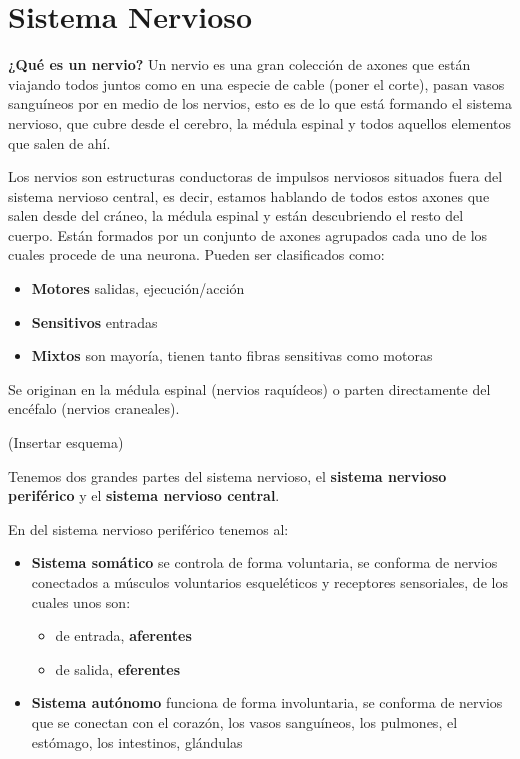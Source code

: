 \section{Sistema Nervioso}


\textbf{¿Qué es un nervio?}
Un nervio es una gran colección de axones que están viajando todos juntos como en una especie de cable (poner el corte), pasan vasos sanguíneos por en medio de los nervios, esto es de lo que está formando el sistema nervioso, que cubre desde el cerebro, la médula espinal y todos aquellos elementos que salen de ahí.

Los nervios son estructuras conductoras de impulsos nerviosos situados fuera del sistema nervioso central, es decir, estamos hablando de todos estos axones que salen desde del cráneo, la médula espinal y están descubriendo el resto del cuerpo.
Están formados por un conjunto de axones agrupados cada uno de los cuales procede de una neurona. Pueden ser clasificados como:

\begin{itemize}
\item \textbf{Motores} salidas, ejecución/acción  
\item \textbf{Sensitivos} entradas 
\item \textbf{Mixtos} son mayoría, tienen tanto fibras sensitivas como motoras
\end{itemize}

Se originan en la médula espinal (nervios raquídeos) o parten directamente del encéfalo (nervios craneales).

(Insertar esquema) 

Tenemos dos grandes partes del sistema nervioso, el \textbf{sistema nervioso periférico} y el \textbf{sistema nervioso central}. 

En del sistema nervioso periférico tenemos al:

\begin{itemize}
 \item \textbf{Sistema somático} se controla de forma voluntaria, se conforma de nervios conectados a músculos voluntarios esqueléticos y receptores sensoriales, de los cuales unos son:
 \begin{itemize}
  \item de entrada, \textbf{aferentes}
  \item de salida, \textbf{eferentes}
 \end{itemize}
\item \textbf{Sistema autónomo} funciona de forma involuntaria, se conforma de nervios que se conectan con el corazón, los vasos sanguíneos, los pulmones, el estómago, los intestinos, glándulas
\end{itemize}

